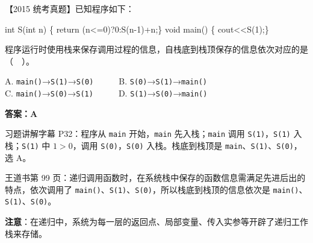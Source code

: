\documentclass[10.5pt,a4paper,oneside]{article}
\newcommand{\hlred}[1]{\textcolor{wdred}{\bfseries #1}}
\newenvironment{Shaded}{}{}
\newcommand{\ControlFlowTok}[1]{\textcolor[rgb]{0.12,0.31,0.71}{#1}}
\newcommand{\DataTypeTok}[1]{\textcolor[rgb]{0.12,0.31,0.71}{#1}}
\newcommand{\DecValTok}[1]{\textcolor[rgb]{0.77,0.35,0.07}{#1}}
\newcommand{\NormalTok}[1]{#1}
\newcommand{\OperatorTok}[1]{\textcolor[rgb]{0.20,0.20,0.20}{#1}}
\begin{document}
\begin{questionbox}[15]

【2015 统考真题】已知程序如下：

\begin{Shaded}
\begin{Highlighting}[]
\DataTypeTok{int}\NormalTok{ S}\OperatorTok{(}\DataTypeTok{int}\NormalTok{ n}\OperatorTok{)}
\OperatorTok{\{}   \ControlFlowTok{return} \OperatorTok{(}\NormalTok{n}\OperatorTok{\textless{}=}\DecValTok{0}\OperatorTok{)?}\DecValTok{0}\OperatorTok{:}\NormalTok{S}\OperatorTok{(}\NormalTok{n}\OperatorTok{{-}}\DecValTok{1}\OperatorTok{)+}\NormalTok{n}\OperatorTok{;\}}
\DataTypeTok{void}\NormalTok{ main}\OperatorTok{()}
\OperatorTok{\{}\NormalTok{   cout}\OperatorTok{\textless{}\textless{}}\NormalTok{S}\OperatorTok{(}\DecValTok{1}\OperatorTok{);\}}
\end{Highlighting}
\end{Shaded}

程序运行时使用栈来保存调用过程的信息，自栈底到栈顶保存的信息依次对应的是（　）。

A. \texttt{main()}→\texttt{S(1)}→\texttt{S(0)}　　　B.
\texttt{S(0)}→\texttt{S(1)}→\texttt{main()}\\
C. \texttt{main()}→\texttt{S(0)}→\texttt{S(1)}　　　D.
\texttt{S(1)}→\texttt{S(0)}→\texttt{main()}

\end{questionbox}

\hlred{\textbf{答案：A}}

\begin{videobox}

习题讲解字幕 P32：程序从 \texttt{main} 开始，\texttt{main}
先入栈；\texttt{main} 调用 \texttt{S(1)}，\texttt{S(1)}
入栈；\texttt{S(1)} 中 \(1>0\)，调用 \texttt{S(0)}，\texttt{S(0)}
入栈。栈底到栈顶是 \texttt{main}、\texttt{S(1)}、\texttt{S(0)}，选 A。

\end{videobox}

\begin{jiexibox}

王道书第 99
页：递归调用函数时，在系统栈中保存的函数信息需满足先进后出的特点，依次调用了
\texttt{main()}、\texttt{S(1)}、\texttt{S(0)}，所以栈底到栈顶的信息依次是
\texttt{main()}、\texttt{S(1)}、\texttt{S(0)}。

\textbf{注意}：在递归中，系统为每一层的返回点、局部变量、传入实参等开辟了递归工作栈来存储。

\end{jiexibox}
\end{document}
